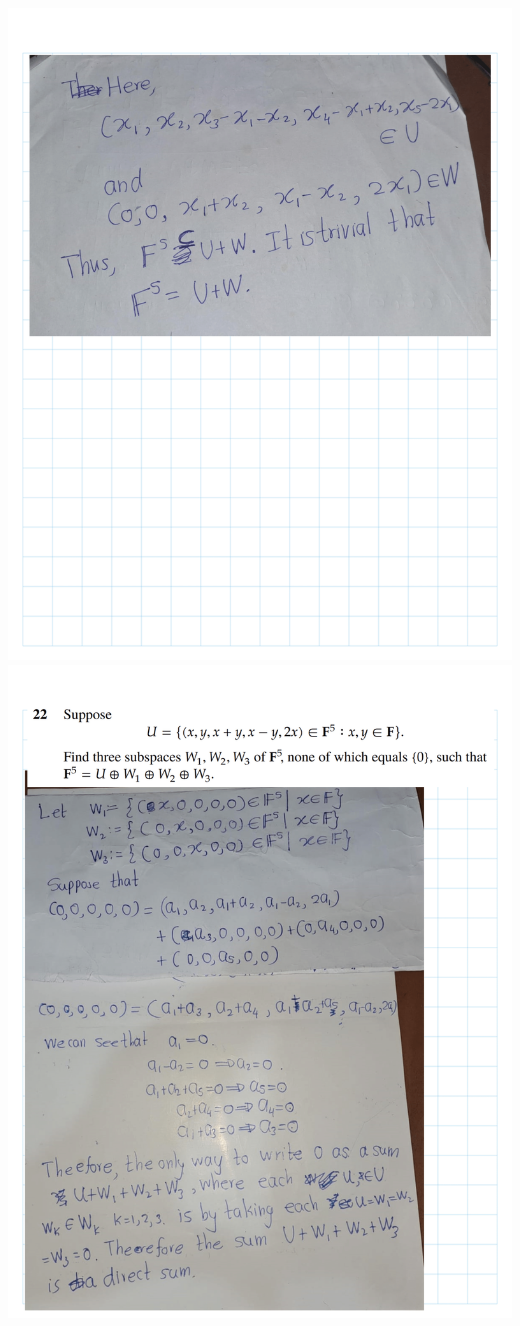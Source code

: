 \documentclass[
]{book}
\theoremstyle{definition}
\theoremstyle{definition}
\theoremstyle{definition}
\theoremstyle{definition}
\theoremstyle{remark}
\begin{document}
\begin{enumerate}
  \includegraphics{fig/Ex1C/Ex/Ex-26.png} \includegraphics{fig/Ex1C/Ex/Ex-27.png}

\end{enumerate}
\end{document}
